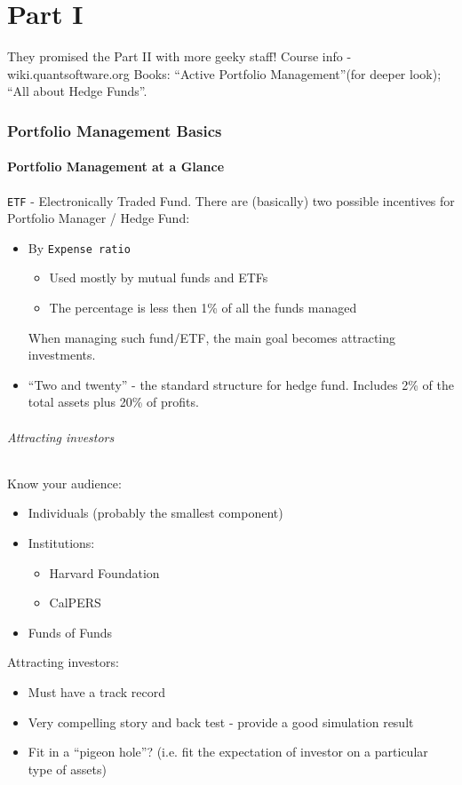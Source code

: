 \documentclass{scrartcl}
\newcommand{\term}[1]{\verb~#1~} %
\begin{document}
\part{Part I}
\label{part:Intro}
They promised the Part II with more geeky staff!
Course info - wiki.quantsoftware.org
Books: ``Active Portfolio Management''(for deeper look); ``All about Hedge Funds''.

\section{Portfolio Management Basics}
\label{sec:Basics}
\subsection{Portfolio Management at a Glance}
\label{sec:PortfolioManagement}
\term{ETF} - Electronically Traded Fund.
There are (basically) two possible incentives for Portfolio Manager / Hedge
Fund:
\begin{itemize}
\item By \term{Expense ratio}
  \begin{itemize}
  \item Used mostly by mutual funds and ETFs
  \item The percentage is less then 1\% of all the funds managed
  \end{itemize}
When managing such fund/ETF, the main goal becomes attracting investments.
\item ``Two and twenty'' - the standard structure for hedge fund. Includes 2\%
  of the total assets plus 20\% of profits.
\end{itemize}

\paragraph{Attracting investors}
Know your audience:
\begin{itemize}
\item Individuals (probably the smallest component)
\item Institutions:
  \begin{itemize}
  \item Harvard Foundation
  \item CalPERS
  \end{itemize}
\item Funds of Funds
\end{itemize}

Attracting investors:
\begin{itemize}
\item Must have a track record
\item Very compelling story and back test - provide a good simulation result 
\item Fit in a ``pigeon hole''? (i.e. fit the expectation of investor on a
  particular type of assets)
\end{itemize}
\end{document}
